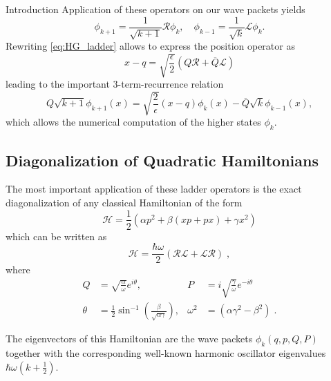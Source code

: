 \begin{chapter}{Introduction}
Application of these operators on our wave packets yields
\begin{equation}
    \label{eq:HG_ladder_applied}
    \phi_{k+1}=\frac{1}{\sqrt{k+1}}\mathcal{R}\phi_k,\quad \phi_{k-1}=\frac{1}{\sqrt{k}}\mathcal{L}\phi_k.
\end{equation}
Rewriting \eqref{eq:HG_ladder} allows to express the position operator as
\begin{equation}
    x-q=\sqrt{\frac{\epsilon}{2}}(Q\mathcal{R}+\overline{Q}\mathcal{L})
\end{equation}
leading to the important 3-term-recurrence relation
\begin{equation}
    Q\sqrt{k+1}\phi_{k+1}(x)=\sqrt{\frac{2}{\epsilon}}(x-q)\phi_k(x)-\overline{Q}\sqrt{k}\phi_{k-1}(x),
\end{equation}
which allows the numerical computation of the higher states $\phi_k$.\\


\subsection{Diagonalization of Quadratic Hamiltonians} %
\label{sub:DiagonalizationHGHam}
The most important application of these ladder operators is the exact diagonalization of any classical Hamiltonian of the form
\begin{equation}
    \label{eq:HG_Hamiltonian}
    \mathcal{H}=\frac{1}{2}\left(\alpha p^2+\beta(xp+px)+\gamma x^2\right)
\end{equation}
which can be written as
\begin{equation}
	\label{eq:HG_OpHamiltonian}
	    \mathcal{H}=\frac{\hbar\omega}{2}(\mathcal{R}\mathcal{L}+\mathcal{L}\mathcal{R})\;,
\end{equation}
where
\begin{align*}
	     Q&=\sqrt{\frac{\alpha}{\omega}}e^{i\theta}, &  P&=i\sqrt{\frac{\gamma}{\omega}}e^{-i\theta}\\
	     \theta&=\frac{1}{2}\sin^{-1}\left(\frac{\beta}{\sqrt{\alpha\gamma}}\right),
	     &\omega^2&=(\alpha\gamma^2-\beta^2)\;. 
\end{align*}

The eigenvectors of this Hamiltonian are the wave packets $\phi_k(q,p,Q,P)$ together with the corresponding well-known harmonic oscillator 
eigenvalues $\hbar\omega(k+\frac{1}{2})$.\\


\end{chapter}
